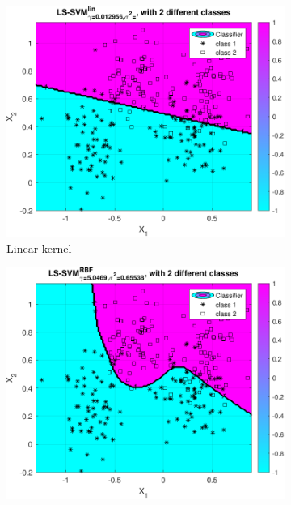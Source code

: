 \documentclass{article}
\begin{document}
            \begin{figure}[H]
                
                 \centering
                 \begin{subfigure}[b]{0.3\textwidth}
                     \centering
                     \includegraphics[width=\textwidth]{Assignment 1/figures/ripley_simplex_linear_classification_result.pdf}
                    \caption{Linear kernel}
                     \label{fig:ripley_linear_result}
                 \end{subfigure}
                 \hfill
                 \begin{subfigure}[b]{0.3\textwidth}
                     \centering
                     \includegraphics[width=\textwidth]{Assignment 1/figures/ripley_simplex_rbf_classification_result.pdf}

\end{subfigure}
\end{figure}
\end{document}
